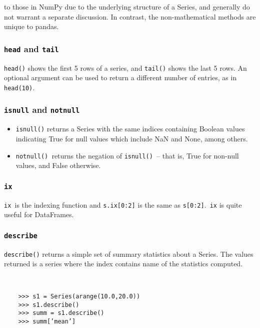 \documentclass[KSmain.tex]{subfiles}
\begin{document}
to those in NumPy due to the underlying structure of a Series, and generally do not warrant a separate
discussion. In contrast, the non-mathematical methods are unique to pandas.
	\subsubsection*{\texttt{head} and \texttt{tail}}
	\texttt{head()} shows the first 5 rows of a series, and \texttt{tail()} shows the last 5 rows. An optional argument can be
	used to return a different number of entries, as in \texttt{head(10)}.
	\subsubsection*{\texttt{isnull} and \texttt{notnull}}
	
	\begin{itemize}
		\item \texttt{isnull()} returns a Series with the same indices containing Boolean values indicating True for null values
		which include NaN and None, among others. 
		
		\item \texttt{notnull() }returns the negation of \texttt{isnull() }– that is, True for
		non-null values, and False otherwise.
	\end{itemize}
	\subsubsection*{\texttt{ix}}
	\texttt{ix }is the indexing function and \texttt{s.ix[0:2]} is the same as \texttt{s[0:2]}.\texttt{ ix} is quite useful for DataFrames.
	
	\subsubsection*{\texttt{describe}}
	\texttt{describe()} returns a simple set of summary statistics about a Series. The values returned is a series where
	the index contains name of the statistics computed.
	\begin{framed}
	\begin{verbatim}


	>>> s1 = Series(arange(10.0,20.0))
	>>> s1.describe()
	>>> summ = s1.describe()
	>>> summ[’mean’]
	\end{verbatim}
\end{framed}
\end{document}
